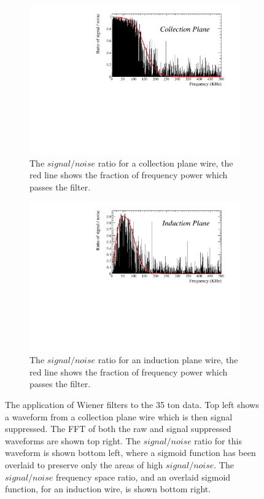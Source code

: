 \begin{figure}
\begin{subfigure}{0.48\textwidth}
    \centering
    \includegraphics[width=\textwidth]{Collection}
    \caption{The $signal/noise$ ratio for a collection plane wire, the red line shows the fraction of frequency power which passes the filter.}
    \label{fig:FreqCollection}
  \end{subfigure}%
  \hspace{0.03\textwidth}%
  \begin{subfigure}{0.48\textwidth}
    \centering
    \includegraphics[width=\textwidth]{Induction}
    \caption{The $signal/noise$ ratio for an induction plane wire, the red line shows the fraction of frequency power which passes the filter.}
    \label{fig:FreqInduction}
  \end{subfigure}
  \caption[Applying Wiener filters to the 35 ton data]
          {The application of Wiener filters to the 35 ton data. Top left shows a waveform from a collection plane wire which is then signal suppressed. The FFT of both the raw and signal suppressed waveforms are shown top right. The $signal/noise$ ratio for this waveform is shown bottom left, where a sigmoid function has been overlaid to preserve only the areas of high $signal/noise$. The $signal/noise$ frequency space ratio, and an overlaid sigmoid function, for an induction wire, is shown bottom right.}
  \label{fig:FrequencyFilter}
\end{figure}


